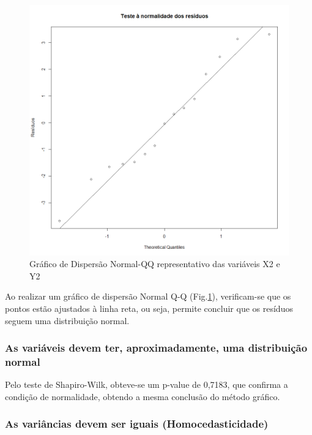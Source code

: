\documentclass[conference]{IEEEtran}
\begin{document}
\begin{figure}[htbp]
\centerline{\includegraphics[width=0.95\columnwidth]{images/03.b.3.png}}
\caption{Gráfico de Dispersão Normal-QQ representativo das variáveis X2 e Y2}
\label{3b3}
\end{figure}

Ao realizar um gráfico de dispersão Normal Q-Q (Fig.\ref{3b3}), verificam-se que os pontos estão ajustados à linha reta, ou seja, permite concluir que os resíduos seguem uma distribuição normal.

\subsubsection{As variáveis devem ter, aproximadamente, uma distribuição normal}

Pelo teste de Shapiro-Wilk, obteve-se um p-value de 0,7183, que confirma a condição de normalidade, obtendo a mesma conclusão do método gráfico.

\subsubsection{As variâncias devem ser iguais (Homocedasticidade)}
\end{document}
